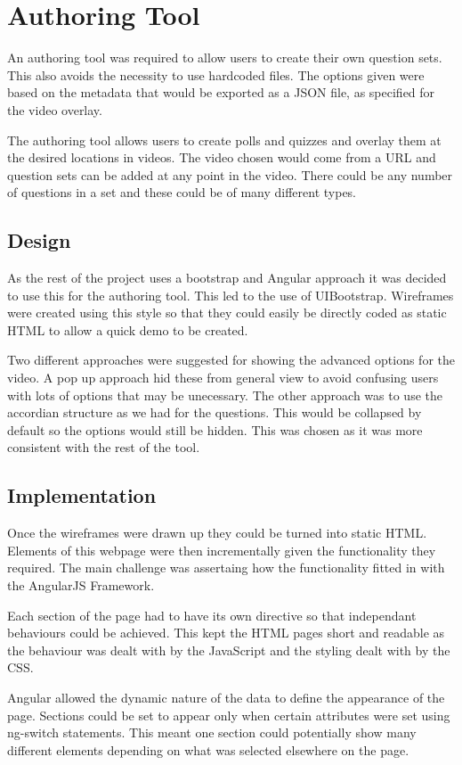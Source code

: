 \chapter{Authoring Tool} 
\label{Chapter:Authoring Tool}
An authoring tool was required to allow users to create their own question sets. This also avoids the necessity to use hardcoded files. The options given were based on the metadata that would be exported as a JSON file, as specified for the video overlay.

The authoring tool allows users to create polls and quizzes and overlay them at the desired locations in videos. The video chosen would come from a URL and question sets can be added at any point in the video. There could be any number of questions in a set and these could be of many different types.
\section{Design} 
\label{Section:Design}
As the rest of the project uses a bootstrap and Angular approach it was decided to use this for the authoring tool. This led to the use of UIBootstrap. Wireframes were created using this style so that they could easily be directly coded as static HTML to allow a quick demo to be created. 

Two different approaches were suggested for showing the advanced options for the video. A pop up approach hid these from general view to avoid confusing users with lots of options that may be unecessary. The other approach was to use the accordian structure as we had for the questions. This would be collapsed by default so the options would still be hidden. This was chosen as it was more consistent with the rest of the tool.

\section{Implementation}
\label{Section:Implementation}
Once the wireframes were drawn up they could be turned into static HTML. Elements of this webpage were then incrementally given the functionality they required. The main challenge was assertaing how the functionality fitted in with the AngularJS Framework. 

Each section of the page had to have its own directive so that independant behaviours could be achieved. This kept the HTML pages short and readable as the behaviour was dealt with by the JavaScript and the styling dealt with by the CSS.

Angular allowed the dynamic nature of the data to define the appearance of the page. Sections could be set to appear only when certain attributes were set using ng-switch statements. This meant one section could potentially show many different elements depending on what was selected elsewhere on the page.